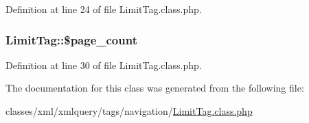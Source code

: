 Definition at line 24 of file Limit\-Tag.\-class.\-php.

\hypertarget{classLimitTag_a3d25270d024a280ac3e1cc7ada2c8fe0}{
\subsubsection[{\$page\-\_\-count}]{\setlength{\rightskip}{0pt plus 5cm}Limit\-Tag\-::\$page\-\_\-count}}\label{classLimitTag_a3d25270d024a280ac3e1cc7ada2c8fe0}


Definition at line 30 of file Limit\-Tag.\-class.\-php.



The documentation for this class was generated from the following file\-:\begin{DoxyCompactItemize}
\item 
classes/xml/xmlquery/tags/navigation/\hyperlink{LimitTag_8class_8php}{Limit\-Tag.\-class.\-php}\end{DoxyCompactItemize}
